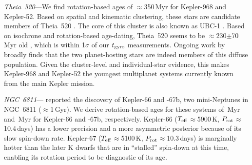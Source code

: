 \documentclass[11pt,twocolumn,tighten]{aastex63}
\begin{document}
{\it Theia~520}---We find rotation-based ages of $\approx$350\,Myr
for Kepler-968 and Kepler-52.  Based on spatial and kinematic
clustering, these stars are candidate 
members of Theia~520 \citep{2019AJ....158..122K}.  The core of this cluster is also known
as UBC-1 \citep{2018A&A...618A..59C}.  Based on isochrone and
rotation-based age-dating, Theia~520 seems to be
$\approx$230$\pm$70\,Myr old
\citep{2024A&A...681A..13F}, which is within
1$\sigma$ of our $t_{\rm gyro}$ measurements.  Ongoing work by
\citet{Curtis2024} broadly finds that the two planet-hosting stars are
indeed members of this diffuse population.  Given the cluster-level
and individual-star evidence, this makes Kepler-968 and Kepler-52 the
youngest multiplanet systems currently known from the main Kepler
mission.

{\it NGC~6811}---\citet{Meibom_2013} reported the discovery of
Kepler-66 and -67b, two mini-Neptunes in NGC~6811 ($\approx$1\,Gyr).
We derive rotation-based ages for these systems of
\kepsixsixtgyro\,Myr and \kepsixseventgyro\,Myr for Kepler-66 and
-67b, respectively.  Kepler-66 ($T_{\rm eff}$$\approx$5900\,K, $P_{\rm
rot}$$\approx$10.4\,days) has a lower precision and a more asymmetric
posterior because of its slow spin-down rate.  Kepler-67 ($T_{\rm
eff}$$\approx$5100\,K, $P_{\rm rot}$$\approx$10.3\,days) is marginally
hotter than the later K dwarfs that are in ``stalled'' spin-down at
this time, enabling its rotation period to be diagnostic of its age.
\end{document}
